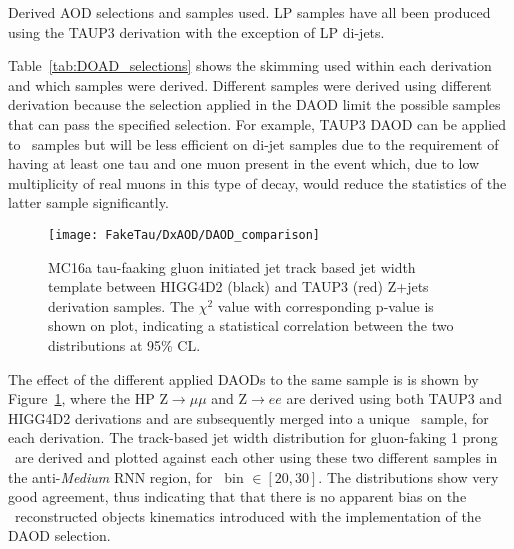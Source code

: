	\begin{table}[!hbt]
	\caption{Derived \ac{AOD} selections and samples used. \ac{LP} samples have all been produced using the TAUP3 derivation with the exception of \ac{LP} di-jets.}
	
	\label{tab:DOAD_selections}
	\end{table}
	Table~\ref{tab:DOAD_selections} shows the skimming used within each derivation and which samples were derived. Different samples were derived using different derivation because the selection applied in the \ac{DAOD} limit the possible samples that can pass the specified selection. 
	For example, TAUP3 \ac{DAOD} can be applied to \Wjets\ samples but will be less efficient on di-jet samples due to the requirement of having at least one tau and one muon present in the event which, due to low multiplicity of real muons in this type of decay, would reduce the statistics of the latter sample significantly.
	
	 \begin{figure}[!hbt]
	\centering
	\texttt{[image: FakeTau/DxAOD/DAOD\_comparison]}
	\caption{MC16a tau-faaking gluon initiated jet track based jet width template between HIGG4D2 (black) and TAUP3 (red) Z+jets derivation samples. The $\chi^2$ value with corresponding p-value is shown on plot, indicating a statistical correlation between the two distributions at 95\% CL.}
	\label{fig:DAOD_comparison}
	\end{figure}
	The effect of the different applied \ac{DAOD}s to the same sample is is shown by Figure~\ref{fig:DAOD_comparison}, where the \ac{HP} Z$\rightarrow\mu\mu$ and Z$\rightarrow e e $ are derived using both TAUP3 and HIGG4D2 derivations and are subsequently merged into a unique \Zjets\ sample, for each derivation.
	The track-based jet width distribution for gluon-faking 1 prong \htau\ are derived and plotted against each other using these two different samples in the anti-\textit{Medium} \ac{RNN} region, for \pt\ bin $\in[20,30]$.  
	 The distributions show very good agreement, thus indicating that that there is no apparent bias on the \htau\ reconstructed objects kinematics introduced with the implementation of the \ac{DAOD} selection. 
	
	
	
